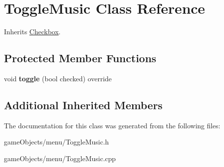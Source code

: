 \hypertarget{class_toggle_music}{\section{Toggle\+Music Class Reference}
\label{class_toggle_music}
}


Inherits \hyperlink{class_checkbox}{Checkbox}.

\subsection*{Protected Member Functions}
\begin{DoxyCompactItemize}
\item 
\hypertarget{class_toggle_music_a0bc62ef2c749ad30960ac483bc047241}{void {\bfseries toggle} (bool checked) override}\label{class_toggle_music_a0bc62ef2c749ad30960ac483bc047241}

\end{DoxyCompactItemize}
\subsection*{Additional Inherited Members}


The documentation for this class was generated from the following files\+:\begin{DoxyCompactItemize}
\item 
game\+Objects/menu/Toggle\+Music.\+h\item 
game\+Objects/menu/Toggle\+Music.\+cpp\end{DoxyCompactItemize}
